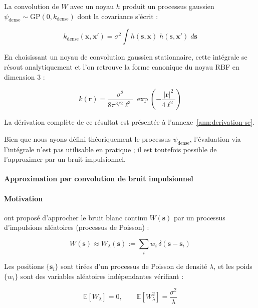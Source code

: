 La convolution de $W$ avec un noyau $h$ produit un processus gaussien $\psi_{\text{dense}} \sim \text{GP}(0, k_{\text{dense}})$ dont la covariance s'écrit :

\begin{equation}
k_{\text{dense}}(\mathbf{x},\mathbf{x}') = \sigma^2 \int h(\mathbf{s}, \mathbf{x})\; h(\mathbf{s}, \mathbf{x}')\; d\mathbf{s}
\end{equation}

En choisissant un noyau de convolution gaussien stationnaire, cette intégrale se résout analytiquement et l'on retrouve la forme canonique du noyau RBF en dimension 3 :

\begin{equation}
k(\mathbf{r}) = \frac{\sigma^2}{8\pi^{3/2}\ell^{3}}\; \exp\!\left(-\frac{|\mathbf{r}|^2}{4\ell^2}\right)
\end{equation}

La dérivation complète de ce résultat est présentée à l'annexe~\ref{ann:derivation-se}.

Bien que nous ayons défini théoriquement le processus $\psi_{\text{dense}}$, l'évaluation via l'intégrale n'est pas utilisable en pratique ; il est toutefois possible de l'approximer par un bruit impulsionnel.

\paragraph{Approximation par convolution de bruit impulsionnel}

\paragraph{Motivation}

\textcite{lewis1986methods,lewis1989algorithms} ont proposé d'approcher le bruit blanc continu $W(\mathbf{s})$ par un processus d'impulsions aléatoires (processus de Poisson) :

\begin{equation}
W(\mathbf{s}) \approx W_\lambda(\mathbf{s}) := \sum_i w_i\, \delta(\mathbf{s} - \mathbf{s}_i)
\end{equation}

Les positions $\{\mathbf{s}_i\}$ sont tirées d'un processus de Poisson de densité $\lambda$, et les poids $\{w_i\}$ sont des variables aléatoires indépendantes vérifiant :

\begin{equation}
\mathbb{E}[W_\lambda] = 0, \qquad \mathbb{E}[W_\lambda^2] = \frac{\sigma^2}{\lambda}
\end{equation}

